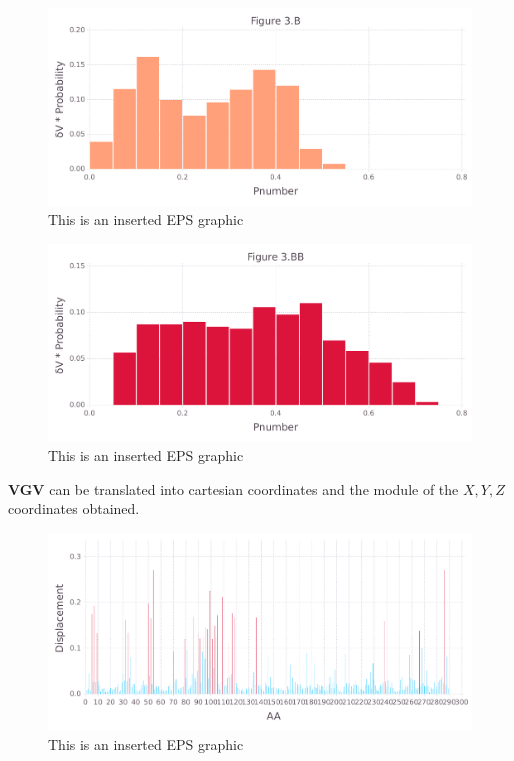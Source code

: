 \documentclass[10pt,letterpaper]{article}
\begin{document}
\begin{figure}[ht]
\begin{center}
\includegraphics[scale=0.5]{1prn/3bfigure_very_hi-precision.pdf}
\caption{This is an inserted EPS graphic}
\label{fig10}
\end{center}
\end{figure}

\begin{figure}[ht]
\begin{center}
\includegraphics[scale=0.5]{1prn/3bbfigure_very_hi-precision.pdf}
\caption{This is an inserted EPS graphic}
\label{fig11}
\end{center}
\end{figure}

\FloatBarrier


\textbf{VGV} can be translated into cartesian coordinates and the module of the \(X, Y, Z\) coordinates obtained.

\begin{figure}[ht]
\begin{center}
\includegraphics[scale=0.5]{1prn/5figure_very_hi-precision.pdf}
\caption{This is an inserted EPS graphic}
\label{fig13}
\end{center}
\end{figure}
\end{document}
